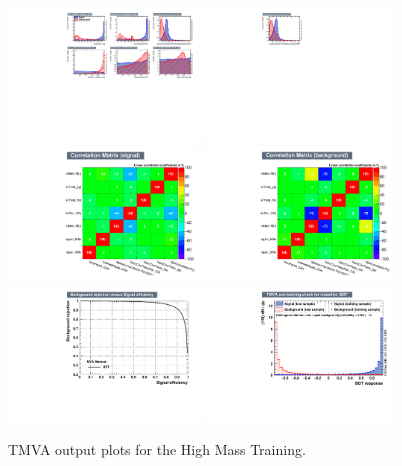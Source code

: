 \begin{figure}[h]
  \centering
  \includegraphics[width=0.45\textwidth]{figures/sec-cats/mva/vars1_hm400}\hfil
  \includegraphics[width=0.45\textwidth]{figures/sec-cats/mva/vars2_hm400}\hfil
  \includegraphics[width=0.45\textwidth]{figures/sec-cats/mva/corsS_hm400}\hfil
  \includegraphics[width=0.45\textwidth]{figures/sec-cats/mva/corsB_hm400}\hfil
  \includegraphics[width=0.45\textwidth]{figures/sec-cats/mva/ROC_hm400}\hfil
  \includegraphics[width=0.45\textwidth]{figures/sec-cats/mva/discr_hm400}\hfil
  \caption{TMVA output plots for the High Mass Training.}
  \label{fig:mva_hm}
\end{figure}

